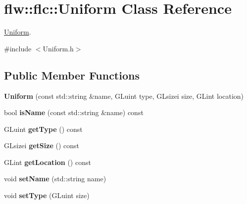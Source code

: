 \hypertarget{classflw_1_1flc_1_1Uniform}{}\section{flw\+:\+:flc\+:\+:Uniform Class Reference}
\label{classflw_1_1flc_1_1Uniform}


\hyperlink{classflw_1_1flc_1_1Uniform}{Uniform}.  




{\ttfamily \#include $<$Uniform.\+h$>$}

\subsection*{Public Member Functions}
\begin{DoxyCompactItemize}
\item 
\mbox{\label{classflw_1_1flc_1_1Uniform_ade3e51943232cbeb223efe1c44199556}} 
{\bfseries Uniform} (const std\+::string \&name, G\+Luint type, G\+Lsizei size, G\+Lint location)
\item 
\mbox{\label{classflw_1_1flc_1_1Uniform_ac914f72f467deec7f53a626b5fe258c8}} 
bool {\bfseries is\+Name} (const std\+::string \&name) const
\item 
\mbox{\label{classflw_1_1flc_1_1Uniform_a278c1a4471cac333e2f5fbc0de4f49d0}} 
G\+Luint {\bfseries get\+Type} () const
\item 
\mbox{\label{classflw_1_1flc_1_1Uniform_a1c4d5abcabf12a11f0692faff66b7d1d}} 
G\+Lsizei {\bfseries get\+Size} () const
\item 
\mbox{\label{classflw_1_1flc_1_1Uniform_a880a973b1c27a8cf3907368f9ab92413}} 
G\+Lint {\bfseries get\+Location} () const
\item 
\mbox{\label{classflw_1_1flc_1_1Uniform_aca1abbba83730199c9df8a237625d23b}} 
void {\bfseries set\+Name} (std\+::string name)
\item 
\mbox{\label{classflw_1_1flc_1_1Uniform_a7c3fd1233f2beb1f93b7fc6f14b8987e}} 
void {\bfseries set\+Type} (G\+Luint size)

\end{DoxyCompactItemize}
